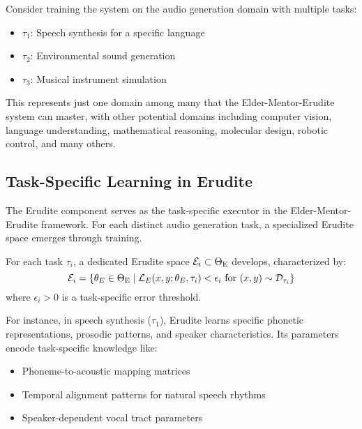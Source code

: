 \begin{example}
Consider training the system on the audio generation domain with multiple tasks:
\begin{itemize}
    \item $\tau_1$: Speech synthesis for a specific language
    \item $\tau_2$: Environmental sound generation
    \item $\tau_3$: Musical instrument simulation
\end{itemize}
This represents just one domain among many that the Elder-Mentor-Erudite system can master, with other potential domains including computer vision, language understanding, mathematical reasoning, molecular design, robotic control, and many others.
\end{example}

\subsection{Task-Specific Learning in Erudite}

The Erudite component serves as the task-specific executor in the Elder-Mentor-Erudite framework. For each distinct audio generation task, a specialized Erudite space emerges through training.

\begin{definition}
For each task $\tau_i$, a dedicated Erudite space $\mathcal{E}_i \subset \Theta_{\text{E}}$ develops, characterized by:
\begin{equation}
\mathcal{E}_i = \{\theta_E \in \Theta_{\text{E}} \mid \mathcal{L}_E(x, y; \theta_E, \tau_i) < \epsilon_i \text{ for } (x,y) \sim \mathcal{D}_{\tau_i}\}
\end{equation}
where $\epsilon_i > 0$ is a task-specific error threshold.
\end{definition}

For instance, in speech synthesis ($\tau_1$), Erudite learns specific phonetic representations, prosodic patterns, and speaker characteristics. Its parameters encode task-specific knowledge like:
\begin{itemize}
    \item Phoneme-to-acoustic mapping matrices
    \item Temporal alignment patterns for natural speech rhythms
    \item Speaker-dependent vocal tract parameters
\end{itemize}

